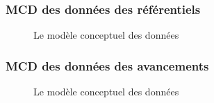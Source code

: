 \documentclass[a4paper]{report}
\begin{document}
\begin{doublespace}
	\subsubsection{MCD des données des référentiels}
	\begin{figure}[H]
		\begin{center}
			\caption{Le modèle conceptuel des données}
		\end{center}
	\end{figure}
	\subsubsection{MCD des données des avancements}
	\begin{figure}[H]
		\begin{center}
			\caption{Le modèle conceptuel des données}
		\end{center}
	\end{figure}

\end{doublespace}
\end{document}
